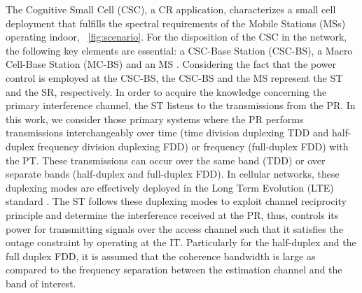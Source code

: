 The Cognitive Small Cell (CSC), a CR application, characterizes a small cell deployment that fulfills the spectral requirements of the Mobile Stations (MSs) operating indoor,  \figurename~\ref{fig:scenario}.
For the disposition of the CSC in the network, the following key elements are essential: a CSC-Base Station (CSC-BS), a Macro Cell-Base Station (MC-BS) and an MS \cite{Kaushik16}.
Considering the fact that the power control is employed at the CSC-BS, the CSC-BS and the MS represent the ST and the SR, respectively. In order to acquire the knowledge concerning the primary interference channel, the ST listens to the transmissions from the PR. In this work, we consider those primary systems where the PR performs transmissions interchangeably over time (time division duplexing TDD and half-duplex frequency division duplexing FDD) or frequency (full-duplex FDD) with the PT. These transmissions can occur over the same band (TDD) or over separate bands (half-duplex and full-duplex FDD). 
In cellular networks, these duplexing modes are effectively deployed in the Long Term Evolution (LTE) standard \cite{LTE09}. The ST follows these duplexing modes to exploit channel reciprocity principle and determine the interference received at the PR, thus, controls its power for transmitting signals over the access channel such that it satisfies the outage constraint by operating at the IT. Particularly for the half-duplex and the full duplex FDD, it is assumed that the coherence bandwidth is large as compared to the frequency separation between the estimation channel and the band of interest. 


